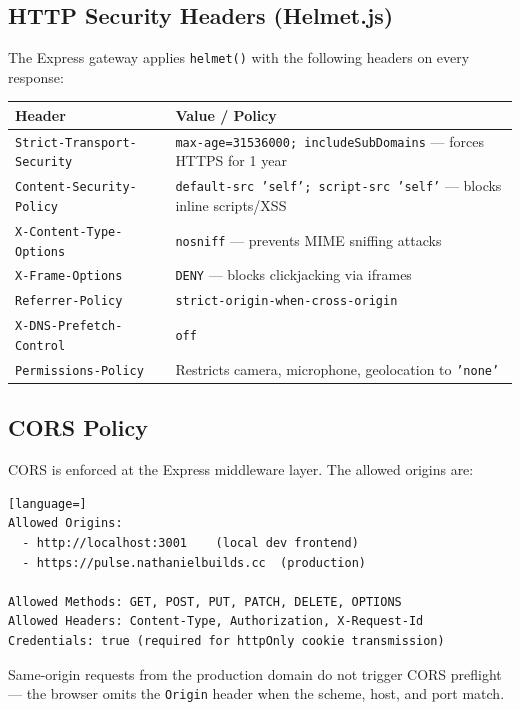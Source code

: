 \documentclass[12pt,a4paper]{article}
\begin{document}
\subsection{HTTP Security Headers (Helmet.js)}

The Express gateway applies \texttt{helmet()} with the following headers on every response:

\begin{tabular}{@{}lp{9cm}@{}}
\toprule
\textbf{Header} & \textbf{Value / Policy} \\
\midrule
\texttt{Strict-Transport-Security} & \texttt{max-age=31536000; includeSubDomains} — forces HTTPS for 1 year \\
\texttt{Content-Security-Policy}   & \texttt{default-src 'self'; script-src 'self'} — blocks inline scripts/XSS \\
\texttt{X-Content-Type-Options}    & \texttt{nosniff} — prevents MIME sniffing attacks \\
\texttt{X-Frame-Options}           & \texttt{DENY} — blocks clickjacking via iframes \\
\texttt{Referrer-Policy}           & \texttt{strict-origin-when-cross-origin} \\
\texttt{X-DNS-Prefetch-Control}    & \texttt{off} \\
\texttt{Permissions-Policy}        & Restricts camera, microphone, geolocation to \texttt{'none'} \\
\bottomrule
\end{tabular}

\subsection{CORS Policy}

CORS is enforced at the Express middleware layer. The allowed origins are:

\begin{lstlisting}[language=]
Allowed Origins:
  - http://localhost:3001    (local dev frontend)
  - https://pulse.nathanielbuilds.cc  (production)

Allowed Methods: GET, POST, PUT, PATCH, DELETE, OPTIONS
Allowed Headers: Content-Type, Authorization, X-Request-Id
Credentials: true (required for httpOnly cookie transmission)
\end{lstlisting}

Same-origin requests from the production domain do not trigger CORS preflight —
the browser omits the \texttt{Origin} header when the scheme, host, and port match.
\end{document}
